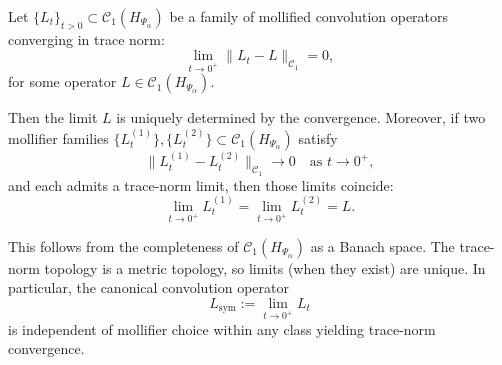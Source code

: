\begin{lemma}
\label{lem:trace_norm_limit_unique}
Let \( \{L_t\}_{t > 0} \subset \mathcal{C}_1(H_{\Psi_\alpha}) \) be a family of mollified convolution operators converging in trace norm:
\[
\lim_{t \to 0^+} \| L_t - L \|_{\mathcal{C}_1} = 0,
\]
for some operator \( L \in \mathcal{C}_1(H_{\Psi_\alpha}) \).

Then the limit \( L \) is uniquely determined by the convergence. Moreover, if two mollifier families \( \{L_t^{(1)}\}, \{L_t^{(2)}\} \subset \mathcal{C}_1(H_{\Psi_\alpha}) \) satisfy
\[
\| L_t^{(1)} - L_t^{(2)} \|_{\mathcal{C}_1} \to 0 \quad \text{as } t \to 0^+,
\]
and each admits a trace-norm limit, then those limits coincide:
\[
\lim_{t \to 0^+} L_t^{(1)} = \lim_{t \to 0^+} L_t^{(2)} = L.
\]

\medskip
\noindent
This follows from the completeness of \( \mathcal{C}_1(H_{\Psi_\alpha}) \) as a Banach space. The trace-norm topology is a metric topology, so limits (when they exist) are unique. In particular, the canonical convolution operator
\[
L_{\mathrm{sym}} := \lim_{t \to 0^+} L_t
\]
is independent of mollifier choice within any class yielding trace-norm convergence.
\end{lemma}
